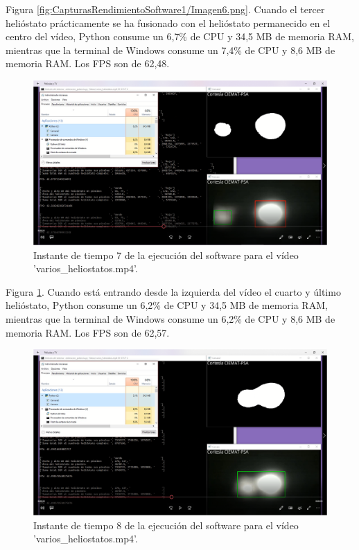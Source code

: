 Figura \ref{fig:CapturasRendimientoSoftware1/Imagen6.png}. Cuando el tercer helióstato prácticamente se ha fusionado con el helióstato permanecido en el centro del vídeo, Python consume un 6,7\% de CPU y 34,5 MB de memoria RAM, mientras que la terminal de Windows consume un 7,4\% de CPU y 8,6 MB de memoria RAM. Los FPS son de 62,48.

\begin{figure}[h!]
  	\centering
	\includegraphics[width=\textwidth]{CapturasRendimientoSoftware1/Imagen7.png}
	\caption{Instante de tiempo 7 de la ejecución del software para el vídeo 'varios\_heliostatos.mp4'.
	\label{fig:CapturasRendimientoSoftware1/Imagen7.png}}
\end{figure}

Figura \ref{fig:CapturasRendimientoSoftware1/Imagen7.png}. Cuando está entrando desde la izquierda del vídeo el cuarto y último helióstato, Python consume un 6,2\% de CPU y 34,5 MB de memoria RAM, mientras que la terminal de Windows consume un 6,2\% de CPU y 8,6 MB de memoria RAM. Los FPS son de 62,57.

\begin{figure}[h!]
  	\centering
	\includegraphics[width=\textwidth]{CapturasRendimientoSoftware1/Imagen8.png}
	\caption{Instante de tiempo 8 de la ejecución del software para el vídeo 'varios\_heliostatos.mp4'.
	\label{fig:CapturasRendimientoSoftware1/Imagen8.png}}
\end{figure}

